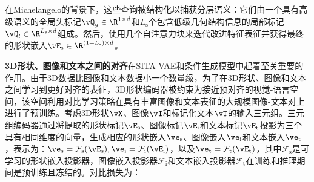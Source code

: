 \documentclass[../../book-main_zh.tex]{subfiles}
\begin{document}
在Michelangelo的背景下，这些查询被结构化以捕获分层语义：它们由一个具有高级语义的全局头标记$\vQ_g \in \R^{1 \times d}$和$L_{\mathrm{s}}$个包含低级几何结构信息的局部标记$\vQ_l \in \R^{L_{\mathrm{s}} \times d}$组成。然后，使用几个自注意力块来迭代改进特征表征并获得最终的形状嵌入$\vE_{\mathrm{s}}
\in \R^{(1+L_{\mathrm{s}}) \times d}$。



\textbf{3D形状、图像和文本之间的对齐}在SITA-VAE和条件生成模型中起着至关重要的作用。由于3D数据比图像和文本数据小一个数量级，为了在3D形状、图像和文本之间学习到更好对齐的表征，3D形状编码器被约束为接近预对齐的视觉-语言空间，该空间利用对比学习策略在具有丰富图像和文本表征的大规模图像-文本对上进行了预训练。考虑3D形状$\vX$、图像$\vI$和标记化文本$\vT$的输入三元组。三元组编码器通过将提取的形状标记$\vE_{\mathrm{s}}$、图像标记$\vE_{\mathrm{i}}$和文本标记$\vE_{\mathrm{t}}$投影为三个具有相同维度的向量，生成相应的形状嵌入$\ve_{\mathrm{s}}$、图像嵌入$\ve_{\mathrm{i}}$和文本嵌入$\ve_{\mathrm{t}}$，表示为：$\ve_{\mathrm{s}} = \mathcal{F}_{\mathrm{s}}(\vE_{\mathrm{s}}),
\ve_{\mathrm{i}} = \mathcal{F}_{\mathrm{i}}(\vE_{\mathrm{i}})$，以及$\ve_{\mathrm{t}} = \mathcal{F}_{\mathrm{t}}(\vE_{\mathrm{t}})$，其中$\mathcal{F}_{\mathrm{s}}$是可学习的形状嵌入投影器，图像嵌入投影器$\mathcal{F}_{\mathrm{i}}$和文本嵌入投影器$\mathcal{F}_{\mathrm{t}}$在训练和推理期间是预训练且冻结的。对比损失为：
\end{document}
